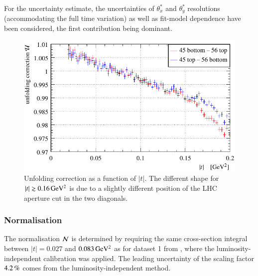 For the uncertainty estimate, the uncertainties of $\theta_x^*$ and $\theta_y^*$ resolutions (accommodating the full time variation) as well as fit-model dependence have been considered, the first contribution being dominant.

\begin{figure}
\begin{center}
\includegraphics{fig/unfolding_correction_comparison.pdf}
\vskip-3mm
\caption{%
Unfolding correction as a function of $|t|$. The different shape for $|t| \gtrsim 0.16\,{\rm GeV^2}$ is due to a slightly different position of the LHC aperture cut in the two diagonals.
}
\label{fig:unfolding}
\end{center}
\end{figure}


\subsubsection{Normalisation}
\label{sec:normalisation}

The normalisation ${\cal N}$ is determined by requiring the same cross-section integral between $|t| = 0.027$ and $0.083\,{\rm GeV^2}$ as for dataset 1 from \cite{prl111}, where the luminosity-independent calibration was applied. The leading uncertainty of the scaling factor $4.2\,{\rm \%}$ comes from the luminosity-independent method.




